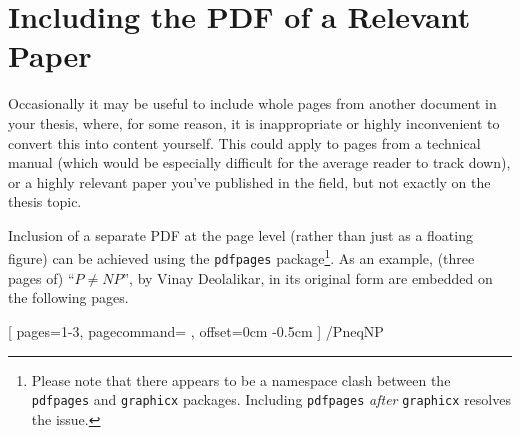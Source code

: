
\section{Including the PDF of a Relevant Paper}\label{ap:relevantPaper}

Occasionally it may be useful to include whole pages from another document in your thesis, where, for some reason, it is inappropriate or highly inconvenient to convert this into content yourself. This could apply to pages from a technical manual (which would be especially difficult for the average reader to track down), or a highly relevant paper you've published in the field, but not exactly on the thesis topic.

Inclusion of a separate PDF at the page level (rather than just as a floating figure) can be achieved using the \texttt{pdfpages} package\footnote{Please note that there appears to be a namespace clash between the \texttt{pdfpages} and \texttt{graphicx} packages. Including \texttt{pdfpages} \emph{after} \texttt{graphicx} resolves the issue.}. As an example, (three pages of) ``$P \neq NP$'', by Vinay Deolalikar, in its original form are embedded on the following pages.


[
    pages=1-3,      %
    pagecommand={\pagestyle{fancyplain}
        \lhead[\fancyplain{}{\thepage}]{\fancyplain{}{\rightmark}}
        \rhead[\fancyplain{}{\leftmark}]{\fancyplain{}{\thepage}}
        \cfoot{}},
    offset=0cm -0.5cm%
]
{\chapdir/PneqNP}

